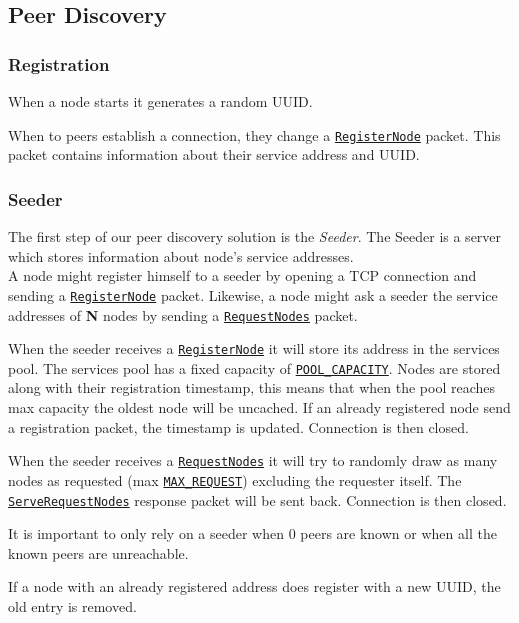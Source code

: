 \documentclass[../documentation.tex]{subfiles}
\begin{document}
\newcommand{\const}[1]{\hyperlink{constants}{\texttt{#1}}}
\newcommand{\packet}[1]{\hyperlink{packets}{\texttt{#1}}}

\subsection{Peer Discovery}

\subsubsection{Registration}

When a node starts it generates a random UUID.

When to peers establish a connection, they change a
\packet{RegisterNode} packet. This packet contains information
about their service address and UUID.

\subsubsection{Seeder}

The first step of our peer discovery solution is the \textit{Seeder}.
The Seeder is a server which stores information about node's service addresses.
\\
A node might register himself to a seeder by opening a TCP connection and sending
a \packet{RegisterNode} packet.
Likewise, a node might ask a seeder the service addresses of \textbf{N} nodes by sending a
\packet{RequestNodes} packet.

When the seeder receives a \packet{RegisterNode} it will store its address in the
services pool. The services pool has a fixed capacity of \const{POOL\_CAPACITY}.
Nodes are stored along with their registration timestamp, this means that when the pool
reaches max capacity the oldest node will be uncached. If an already registered node
send a registration packet, the timestamp is updated.
Connection is then closed.

When the seeder receives a \packet{RequestNodes} it will try to randomly draw
as many nodes as requested (max \const{MAX\_REQUEST}) excluding the requester itself.
The \packet{ServeRequestNodes} response packet will be sent back.
Connection is then closed.

It is important to only rely on a seeder when 0 peers are known or when all
the known peers are unreachable.

If a node with an already registered address does register with a new UUID, the old entry is removed.
\end{document}
